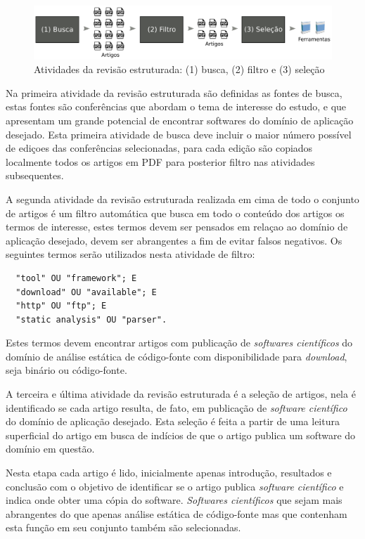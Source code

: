 \begin{figure}[h]
  \center
  \includegraphics[scale=0.21]{imagens/revisao-estruturada.png}
  \caption{Atividades da revisão estruturada: (1) busca, (2) filtro e (3) seleção}
  \label{figura-revisao-estruturada}
\end{figure}

Na primeira atividade da revisão estruturada são definidas as fontes de busca,
estas fontes são conferências que abordam o tema de interesse do estudo, e que
apresentam um grande potencial de encontrar softwares do domínio de aplicação
desejado. Esta primeira atividade de busca deve incluir o maior número possível
de ediçoes das conferências selecionadas, para cada edição são copiados
localmente todos os artigos em PDF para posterior filtro nas atividades
subsequentes.

A segunda atividade da revisão estruturada realizada em cima de todo o conjunto
de artigos é um filtro automática que busca em todo o conteúdo dos artigos os
termos de interesse, estes termos devem ser pensados em relaçao ao domínio de
aplicação desejado, devem ser abrangentes a fim de evitar falsos negativos.
Os seguintes termos serão utilizados nesta atividade de filtro:

\begin{verbatim}
  "tool" OU "framework"; E
  "download" OU "available"; E
  "http" OU "ftp"; E
  "static analysis" OU "parser".
\end{verbatim}

Estes termos devem encontrar artigos com publicação de {\it softwares
científicos} do domínio de análise estática de código-fonte com disponibilidade
para {\it download}, seja binário ou código-fonte.

A terceira e última atividade da revisão estruturada é a seleção de artigos,
nela é identificado se cada artigo resulta, de fato, em publicação de {\it
software científico} do domínio de aplicação desejado. Esta seleção é feita a
partir de uma leitura superficial do artigo em busca de indícios de que o
artigo publica um software do domínio em questão.

Nesta etapa cada artigo é lido, inicialmente apenas introdução, resultados e
conclusão com o objetivo de identificar se o artigo publica {\it software
científico} e indica onde obter uma cópia do software. {\it Softwares
científicos} que sejam mais abrangentes do que apenas análise estática de
código-fonte mas que contenham esta função em seu conjunto também são
selecionadas.

